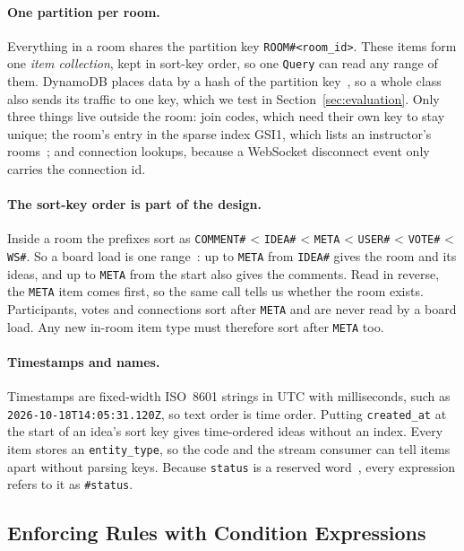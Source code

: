 \paragraph{One partition per room.} Everything in a room shares the partition key
\texttt{ROOM\#\textless room\_id\textgreater}. These items form one \emph{item collection}, kept
in sort-key order, so one \texttt{Query} can read any range of them. DynamoDB places data by a
hash of the partition key~\cite{elhemali2022}, so a whole class also sends its traffic to one
key, which we test in Section~\ref{sec:evaluation}. Only three things live outside the room: join
codes, which need their own key to stay unique; the room's entry in the sparse index GSI1, which
lists an instructor's rooms~\cite{sparse}; and connection lookups, because a WebSocket disconnect
event only carries the connection id.

\paragraph{The sort-key order is part of the design.} Inside a room the prefixes sort as
\texttt{COMMENT\#} \textless{} \texttt{IDEA\#} \textless{} \texttt{META} \textless{}
\texttt{USER\#} \textless{} \texttt{VOTE\#} \textless{} \texttt{WS\#}. So a board load is one
range~\cite{key-conditions}: up to \texttt{META} from \texttt{IDEA\#} gives the room and its
ideas, and up to \texttt{META} from the start also gives the comments. Read in reverse, the
\texttt{META} item comes first, so the same call tells us whether the room exists. Participants,
votes and connections sort after \texttt{META} and are never read by a board load. Any new
in-room item type must therefore sort after \texttt{META} too.

\paragraph{Timestamps and names.} Timestamps are fixed-width ISO~8601 strings in UTC with
milliseconds, such as \texttt{2026-10-18T14:05:31.120Z}, so text order is time order. Putting
\texttt{created\_at} at the start of an idea's sort key gives time-ordered ideas without an
index. Every item stores an \texttt{entity\_type}, so the code and the stream consumer can tell
items apart without parsing keys. Because \texttt{status} is a reserved
word~\cite{reserved-words}, every expression refers to it as \texttt{\#status}.

\subsection{Enforcing Rules with Condition Expressions}\label{sec:dm-rules}

